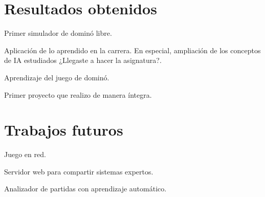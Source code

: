 

\section{Resultados obtenidos}

Primer simulador de dominó libre.

Aplicación de lo aprendido en la carrera. En especial, ampliación de los conceptos de IA estudiados ¿Llegaste a hacer la asignatura?.

Aprendizaje del juego de dominó.

Primer proyecto que realizo de manera íntegra.

\section{Trabajos futuros}

Juego en red.

Servidor web para compartir sistemas expertos.

Analizador de partidas con aprendizaje automático.

